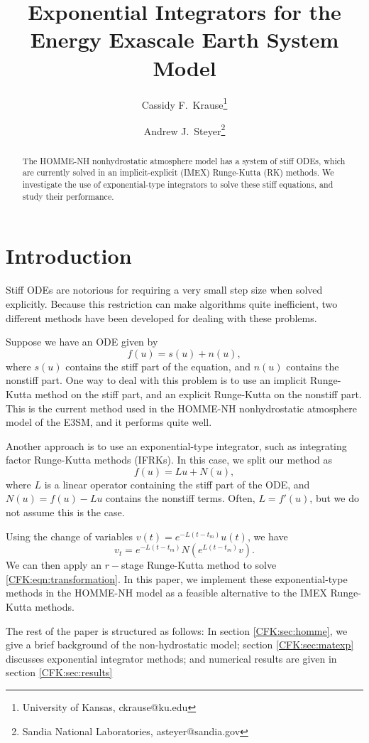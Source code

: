 \documentclass{csri19}
\title{Exponential Integrators for the Energy Exascale Earth System Model}
\author{Cassidy F.\ Krause\thanks{University of Kansas, ckrause@ku.edu} \and Andrew J.\ Steyer\thanks{Sandia National Laboratories,
asteyer@sandia.gov}}
\begin{document}
\maketitle

\begin{abstract}
The HOMME-NH nonhydrostatic atmosphere model has a system of stiff ODEs, which are currently solved in an implicit-explicit (IMEX) Runge-Kutta (RK) methods. We investigate the use of exponential-type integrators to solve these stiff equations, and study their performance.
\end{abstract}

\section{Introduction} \label{CFK:sec:intro}
Stiff ODEs are notorious for requiring a very small step size when solved explicitly. Because this restriction can make algorithms quite inefficient, two different methods have been developed for dealing with these problems. 

Suppose we have an ODE given by 
\[ f(u) = s(u) + n(u),\] where $s(u)$ contains the stiff part of the equation, and $n(u)$ contains the nonstiff part. 
One way to deal with this problem is to use an implicit Runge-Kutta method on the stiff part, and an explicit Runge-Kutta on the nonstiff part. 
This is the current method used in the HOMME-NH nonhydrostatic atmosphere model of the E3SM, and it performs quite well.

Another approach is to use an exponential-type integrator, such as integrating factor Runge-Kutta methods (IFRKs). In this case, we split our method as
\[ f(u) = Lu + N(u),\] where $L$ is a linear operator containing the stiff part of the ODE, and $N(u) = f(u) - Lu$ contains the nonstiff terms. Often, $L = f'(u)$, but we do not assume this is the case. 

Using the change of variables $v(t) = e^{-L(t-t_m)}u(t)$, we have
\begin{equation}\label{CFK:eqn:transformation}
v_t = e^{-L(t-t_m)}N(e^{L(t-t_m)}v).
\end{equation} 
We can then apply an $r-$stage Runge-Kutta method to solve \ref{CFK:eqn:transformation}. In this paper, we implement these exponential-type methods in the HOMME-NH model as a feasible alternative to the IMEX Runge-Kutta methods.

The rest of the paper is structured as follows: In section \ref{CFK:sec:homme}, we give a brief background of the non-hydrostatic model; 
section \ref{CFK:sec:matexp} discusses exponential integrator methods; and numerical results are given in section \ref{CFK:sec:results}
\end{document}
